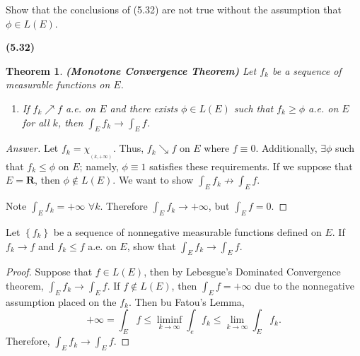 \documentclass[12pt]{book}
\newcommand{\set}[1]{\left\{ #1 \right\}}
\newcommand{\ind}[1]{\chi_{_{#1}}}
\newcommand{\R}{\mathbf{R}}
\renewcommand{\.}{\mkern1mu}
\renewcommand{\qed}{\hfill $\blacksquare$}
\newcommand{\ea}{\hfill $\bf{\dashv}$}
\newenvironment{pf}{\begin{proof}\setlength{\parindent}{\normalparindent}\setlength{\parskip}{\normalparskip}}{\end{proof}}
\newenvironment{ans}{\begin{proof}[Answer] \renewcommand{\qed}{\ea}\setlength{\parindent}{\normalparindent}\setlength{\parskip}{\normalparskip}}{\end{proof}}
\theoremstyle{theorem}
\newtheorem{theorem}{Theorem}
\newcommand{\thmindent}{\setlength{\parindent}{17pt}}
\newenvironment{thm}[1]
	{\noindent \textbf{#1}\hspace{2ex}\begin{minipage}[t]{\linewidth - \widthof{\textbf{(#1)}}}  \begin{theorem}\thmindent }
	{\end{theorem}\end{minipage}\medskip}
\renewcommand{\bf}[1]{\boldsymbol{#1}}
\newlength{\normalparindent}
\newlength{\normalparskip}
\begin{document}
	\item Show that the conclusions of (5.32) are not true without the assumption that $\phi \in L(E)$. 
	
	\begin{thm}{(5.32)}
		\textbf{(Monotone Convergence Theorem)} Let ${f_k}$ be a sequence of measurable functions on $E$.
			\begin{enumerate}[label = (\roman*)]
				\item If $f_k \nearrow f$ a.e. on $E$ and there exists $\phi \in L(E)$ such that $f_k \geq \phi$ a.e. on $E$ for all $k$, then $\int_E f_k \to \int_E f$.
			\end{enumerate}
	\end{thm}
	\begin{ans}
		Let $f_k = \ind{(k,+\infty)}$. Thus, $f_k \searrow f$ on $E$ where $f \equiv 0$. Additionally, $\exists \phi$ such that $f_k \leq \phi$ on $E$; namely, $\phi \equiv 1$ satisfies these requirements. If we suppose that $E = \R$, then $\phi \notin L(E)$. We want to show $\int_E f_k \not\to \int_E f$. 
		
		Note $\int_E  f_k = +\infty$ $\forall k$. Therefore $\int_E f_k  \to + \infty$, but $\int_E f  = 0$.
	\end{ans}
	
	\item Let $\set{f_k}$ be a sequence of nonnegative measurable functions defined on $E$. If $f_k \to f$ and $f_k \leq f$ a.e. on $E$, show that $\int_E f_k \to \int_E f$.
	
	\begin{pf}
		Suppose that $f\in L(E)$, then by Lebesgue's Dominated Convergence theorem, $\int_E f_k \to \int_E f$. If $f \notin L(E)$, then $\int_E f = +\infty$ due to the nonnegative assumption placed on the $f_k$. Then bu Fatou's Lemma, 
		\[ + \infty = \int_E f \leq \underset{k\to\infty}{\liminf} \int_e f_k \leq \underset{k\to\infty}{\lim} \int_E f_k. \]
		Therefore, $\int_E f_k \to \int_E f$.
	\end{pf}
	
\end{document}
